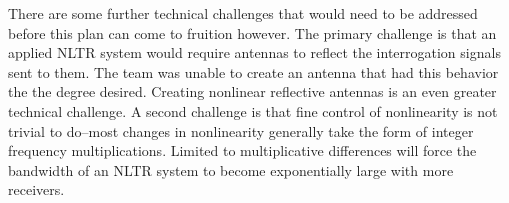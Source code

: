 There are some further technical challenges that would need to be addressed before this plan can come to fruition however. The primary challenge is that an applied NLTR system would require antennas to reflect the interrogation signals sent to them. The team was unable to create an antenna that had this behavior the the degree desired. Creating nonlinear reflective antennas is an even greater technical challenge. A second challenge is that fine control of nonlinearity is not trivial to do--most changes in nonlinearity generally take the form of integer frequency multiplications. Limited to multiplicative differences will force the bandwidth of an NLTR system to become exponentially large with more receivers.
